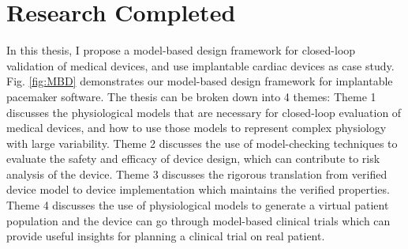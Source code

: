 \documentclass[a4paper,11pt]{article}
\begin{document}
\section{Research Completed}
In this thesis, I propose a model-based design framework for closed-loop validation of medical devices, and use implantable cardiac devices as case study.
Fig. \ref{fig:MBD} demonstrates our model-based design framework for implantable pacemaker software.
The thesis can be broken down into 4 themes:
Theme 1 discusses the physiological models that are necessary for closed-loop evaluation of medical devices, and how to use those models to represent complex physiology with large variability.
Theme 2 discusses the use of model-checking techniques to evaluate the safety and efficacy of device design, which can contribute to risk analysis of the device.
Theme 3 discusses the rigorous translation from verified device model to device implementation which maintains the verified properties.
Theme 4 discusses the use of physiological models to generate a virtual patient population and the device can go through model-based clinical trials which can provide useful insights for planning a clinical trial on real patient.
\end{document}

